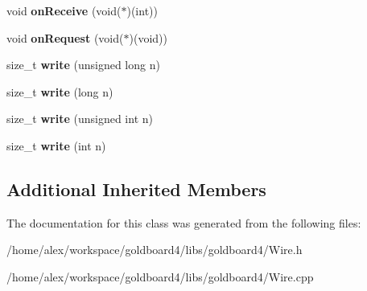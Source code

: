 \begin{DoxyCompactItemize}
\item 
void {\bfseries on\+Receive} (void($\ast$)(int))\hypertarget{class_two_wire_a860d97eb825c6fdca388f2f0577cc34a}{}\label{class_two_wire_a860d97eb825c6fdca388f2f0577cc34a}

\item 
void {\bfseries on\+Request} (void($\ast$)(void))\hypertarget{class_two_wire_a224bf8799dda398fc0db223801852ca5}{}\label{class_two_wire_a224bf8799dda398fc0db223801852ca5}

\item 
size\+\_\+t {\bfseries write} (unsigned long n)\hypertarget{class_two_wire_a0c9d09ead8fcddf2a84781fe77d3c975}{}\label{class_two_wire_a0c9d09ead8fcddf2a84781fe77d3c975}

\item 
size\+\_\+t {\bfseries write} (long n)\hypertarget{class_two_wire_a55a9894186458e43852f6fb7c59bb066}{}\label{class_two_wire_a55a9894186458e43852f6fb7c59bb066}

\item 
size\+\_\+t {\bfseries write} (unsigned int n)\hypertarget{class_two_wire_afdb917746ee37f72e7452b4782e9527b}{}\label{class_two_wire_afdb917746ee37f72e7452b4782e9527b}

\item 
size\+\_\+t {\bfseries write} (int n)\hypertarget{class_two_wire_a8ec34b0d2a75e8b2751eb9f4332bd7c3}{}\label{class_two_wire_a8ec34b0d2a75e8b2751eb9f4332bd7c3}

\end{DoxyCompactItemize}
\subsection*{Additional Inherited Members}


The documentation for this class was generated from the following files\+:\begin{DoxyCompactItemize}
\item 
/home/alex/workspace/goldboard4/libs/goldboard4/Wire.\+h\item 
/home/alex/workspace/goldboard4/libs/goldboard4/Wire.\+cpp\end{DoxyCompactItemize}

